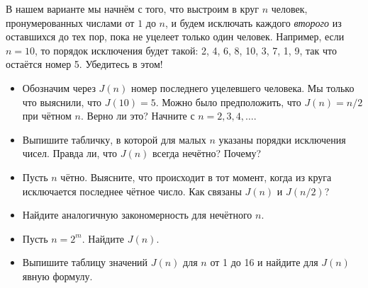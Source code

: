 \documentclass[10pt]{scrbook} \usepackage{modules/nonstahp_book}
\begin{document}
В нашем варианте мы начнём с того, что выстроим в круг $n$ человек, пронумерованных числами от $1$ до $n$, и будем исключать каждого {\it второго} из оставшихся до тех пор, пока не уцелеет только один человек. Например, если $n = 10$, то порядок исключения будет такой: 2, 4, 6, 8, 10, 3, 7, 1, 9, так что остаётся номер 5. Убедитесь в этом!
\begin{itemize}
\item Обозначим через $J(n)$ номер последнего уцелевшего человека. Мы только что выяснили, что $J(10) = 5$. Можно было предположить, что $J(n) = n/2$ при чётном $n$. Верно ли это? Начните с $n = 2,3,4,\ldots$.
\item Выпишите табличку, в которой для малых $n$ указаны порядки исключения чисел. Правда ли, что $J(n)$ всегда нечётно? Почему?
\item Пусть $n$ чётно. Выясните, что происходит в тот момент, когда из круга исключается последнее чётное число. Как связаны $J(n)$ и $J(n/2)$?
\item Найдите аналогичную закономерность для нечётного $n$.
\item Пусть $n = 2^m$. Найдите $J(n)$.
\item Выпишите таблицу значений $J(n)$ для $n$ от 1 до 16 и найдите для $J(n)$ явную формулу.
\end{itemize}
\end{document}
